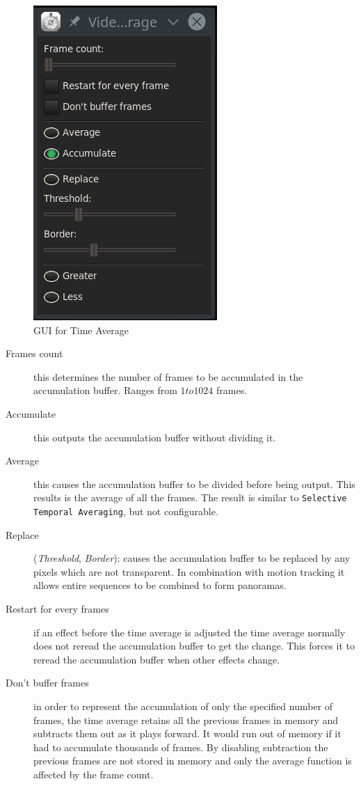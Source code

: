 \begin{figure}[hbtp]
    \centering
    \includegraphics[width=0.35\linewidth]{images/timeaverage.png}
    \caption{GUI for Time Average}
    \label{fig:timeaverage}
\end{figure}

\begin{description}
    \item[Frames count] this determines the number of frames to be accumulated in the accumulation buffer. Ranges from $1 to 1024$ frames.
    \item[Accumulate] this outputs the accumulation buffer without dividing it.
    \item[Average] this causes the accumulation buffer to be divided before being output. This results is the average of all the frames. The result is similar to \texttt{Selective Temporal Averaging}, but not configurable.
    \item[Replace] (\textit{Threshold}, \textit{Border}): causes the accumulation buffer to be replaced by any pixels which are not transparent. In combination with motion tracking it allows entire sequences to be combined to form panoramas.
    \item[Restart for every frames] if an effect before the time average is adjusted the time average normally does not reread the accumulation buffer to get the change. This forces it to reread the accumulation buffer when other effects change.
    \item[Don’t buffer frames] in order to represent the accumulation of only the specified number of frames, the time average retains all the previous frames in memory and subtracts them out as it plays forward. It would run out of memory if it had to accumulate thousands of frames. By disabling subtraction the previous frames are not stored in memory and only the average function is affected by the frame count.
\end{description}

